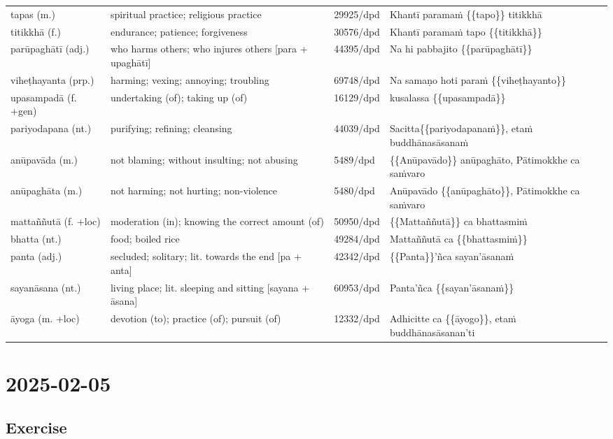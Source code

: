 \documentclass[11pt,oneside]{memoir}
\begin{document}
\begin{longtable}{L{\colOne} L{\colTwo} H H}
tapas (m.) & spiritual practice; religious practice & 29925/dpd & Khantī paramaṁ \{\{tapo\}\} titikkhā\\[0pt]
titikkhā (f.) & endurance; patience; forgiveness & 30576/dpd & Khantī paramaṁ tapo \{\{titikkhā\}\}\\[0pt]
parūpaghātī (adj.) & who harms others; who injures others [para + upaghātī] & 44395/dpd & Na hi pabbajito \{\{parūpaghātī\}\}\\[0pt]
viheṭhayanta (prp.) & harming; vexing; annoying; troubling & 69748/dpd & Na samaṇo hoti paraṁ \{\{viheṭhayanto\}\}\\[0pt]
upasampadā (f. +gen) & undertaking (of); taking up (of) & 16129/dpd & kusalassa \{\{upasampadā\}\}\\[0pt]
pariyodapana (nt.) & purifying; refining; cleansing & 44039/dpd & Sacitta\{\{pariyodapanaṁ\}\}, etaṁ buddhānasāsanaṁ\\[0pt]
anūpavāda (m.) & not blaming; without insulting; not abusing & 5489/dpd & \{\{Anūpavādo\}\} anūpaghāto, Pātimokkhe ca saṁvaro\\[0pt]
anūpaghāta (m.) & not harming; not hurting; non-violence & 5480/dpd & Anūpavādo \{\{anūpaghāto\}\}, Pātimokkhe ca saṁvaro\\[0pt]
mattaññutā (f. +loc) & moderation (in); knowing the correct amount (of) & 50950/dpd & \{\{Mattaññutā\}\} ca bhattasmiṁ\\[0pt]
bhatta (nt.) & food; boiled rice & 49284/dpd & Mattaññutā ca \{\{bhattasmiṁ\}\}\\[0pt]
panta (adj.) & secluded; solitary; lit. towards the end [pa + anta] & 42342/dpd & \{\{Panta\}\}'ñca sayan'āsanaṁ\\[0pt]
sayanāsana (nt.) & living place; lit. sleeping and sitting [sayana + āsana] & 60953/dpd & Panta'ñca \{\{sayan'āsanaṁ\}\}\\[0pt]
āyoga (m. +loc) & devotion (to); practice (of); pursuit (of) & 12332/dpd & Adhicitte ca \{\{āyogo\}\}, etaṁ buddhānasāsanan'ti\\[0pt]
\end{longtable}

\chapter{2025-02-05}
\label{sec:org30ffc3b}
\section{Exercise}
\label{sec:org671f735}
\end{document}
